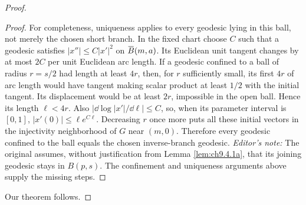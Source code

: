 \documentclass[../main]{subfiles}
\begin{document}
\begin{proof}
\begin{proof}
For completeness, uniqueness applies to every geodesic lying in this ball, not merely the chosen short branch. In the fixed chart choose $C$ such that a geodesic satisfies $|x''|\leq C|x'|^2$ on $\xoverline B(m,a)$. Its Euclidean unit tangent changes by at most $2C$ per unit Euclidean arc length. If a geodesic confined to a ball of radius $r=s/2$ had length at least $4r$, then, for $r$ sufficiently small, its first $4r$ of arc length would have tangent making scalar product at least $1/2$ with the initial tangent. Its displacement would be at least $2r$, impossible in the open ball. Hence its length $\ell<4r$. Also $|\dd\log|x'|/\dd\ell|\leq C$, so, when its parameter interval is $[0,1]$, $|x'(0)|\leq\ell e^{C\ell}$. Decreasing $r$ once more puts all these initial vectors in the injectivity neighborhood of $G$ near $(m,0)$. Therefore every geodesic confined to the ball equals the chosen inverse-branch geodesic. \emph{Editor's note:} The original assumes, without justification from Lemma \ref{lem:ch9.4.1a}, that its joining geodesic stays in $B(p,s)$. The confinement and uniqueness arguments above supply the missing steps.
\end{proof}


Our theorem follows.
\end{proof}
\end{document}
